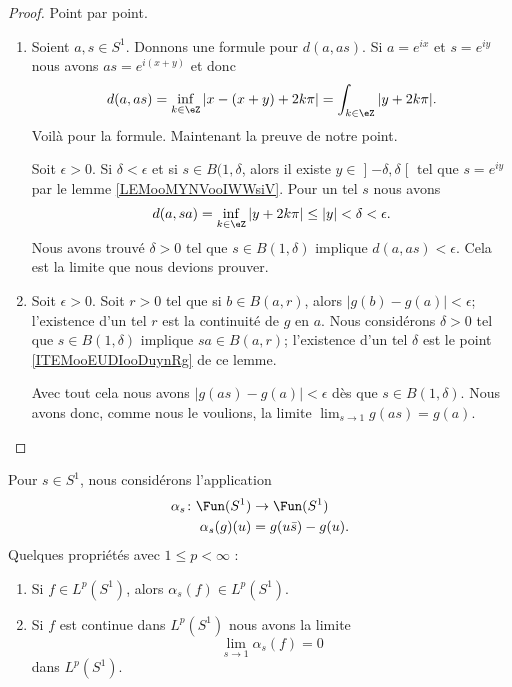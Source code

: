 \begin{proof}
	Point par point.
	\begin{enumerate}
		\item
		      Soient \( a,s\in S^1\). Donnons une formule pour \( d(a,as)\). Si \( a= e^{ix}\) et \( s= e^{iy}\) nous avons \( as= e^{i(x+y)}\) et donc
		      \begin{equation}
			      d(a,as)=\inf_{k\in \eZ}| x-(x+y)+2k\pi |=\int_{k\in \eZ}| y+2k\pi |.
		      \end{equation}
		      Voilà pour la formule. Maintenant la preuve de notre point.

		      Soit \( \epsilon>0\). Si \( \delta<\epsilon\) et si \( s\in B(1,\delta\), alors il existe \( y\in \mathopen] -\delta , \delta \mathclose[\) tel que \( s= e^{iy}\) par le lemme \ref{LEMooMYNVooIWWsiV}. Pour un tel \( s\) nous avons
		      \begin{equation}
			      d(a,sa)=\inf_{k\in \eZ}| y+2k\pi |\leq | y |<\delta<\epsilon.
		      \end{equation}
		      Nous avons trouvé \( \delta>0\) tel que \( s\in B(1,\delta)\) implique \( d(a,as)<\epsilon\). Cela est la limite que nous devions prouver.
		\item
		      Soit \( \epsilon>0\). Soit \( r>0\) tel que si \( b\in B(a,r)\), alors \( | g(b)-g(a) |<\epsilon\); l'existence d'un tel \( r\) est la continuité de \( g\) en \( a\). Nous considérons \( \delta>0\) tel que \( s\in B(1,\delta)\) implique \( sa\in B(a,r)\); l'existence d'un tel \( \delta\) est le point \ref{ITEMooEUDIooDuynRg} de ce lemme.

		      Avec tout cela nous avons \( | g(as)-g(a) |<\epsilon\) dès que \( s\in B(1,\delta)\). Nous avons donc, comme nous le voulions, la limite \( \lim_{s\to 1} g(as)=g(a)\).
	\end{enumerate}
\end{proof}

\begin{lemma}
	Pour \( s\in S^1\), nous considérons l'application
	\begin{equation}
		\begin{aligned}
			\alpha_s\colon \Fun(S^1) & \to \Fun(S^1)     \\
			\alpha_s(g)(u)           & =g(u\bar s)-g(u).
		\end{aligned}
	\end{equation}
	Quelques propriétés avec \( 1\leq p<\infty\) :
	\begin{enumerate}
		\item
		      Si \( f\in L^p(S^1)\), alors \( \alpha_s(f)\in L^p(S^1)\).
		\item
		      Si \( f\) est continue dans \( L^p(S^1)\) nous avons la limite
		      \begin{equation}
			      \lim_{s\to 1} \alpha_s(f)=0
		      \end{equation}
		      dans \( L^p(S^1)\).
	\end{enumerate}
\end{lemma}

